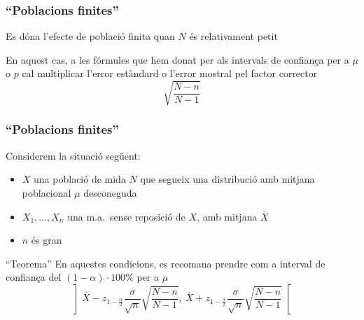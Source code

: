 \documentclass[12pt,t]{beamer}
\renewcommand{\emph}[1]{{\color{red}#1}}
\theoremstyle{plain}
\theoremstyle{definition}
\begin{document}
\begin{frame}
\frametitle{``Poblacions finites''}

Es dóna l'efecte de \emph{població finita} quan $N$ és relativament petit
\medskip

En aquest cas, a les fórmules que hem donat per als intervals de confiança per a $\mu$ o $p$ cal multiplicar l'error estàndard o l'error mostral pel factor corrector
$$
\sqrt{\frac{N-n}{N-1}}
$$

\end{frame}

\begin{frame}
\frametitle{``Poblacions finites''}

Considerem  la situació següent:
\begin{itemize}
\item  $X$ una població de mida $N$ que segueix una distribució amb mitjana poblacional $\mu$ desconeguda

\item $X_1,\ldots,X_n$ una m.a.\ sense reposició de $X$, amb mitjana $\overline{X}$

\item  $n$ és gran 
\end{itemize}

\begin{block}{``Teorema''}
En aquestes condicions, es recomana prendre com a interval  de confiança del $(1-\alpha)\cdot 100\%$ per a $\mu$
$$
\left]\overline{X}-z_{1-\frac{\alpha}{2}}\frac{\sigma}{\sqrt{n}}\sqrt{\frac{N-n}{N-1}},\
    \overline{X}+z_{1-\frac{\alpha}{2}}\frac{\sigma}{\sqrt{n}}\sqrt{\frac{N-n}{N-1}}\right[
$$
\end{block}



\end{frame}
\end{document}
